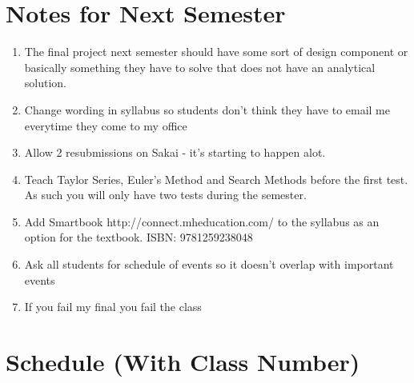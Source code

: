 \section{Notes for Next Semester}

\begin{enumerate}

\item The final project next semester should have some sort of design
  component or basically something they have to solve that does not
  have an analytical solution.

\item Change wording in syllabus so students don't think they have to
  email me everytime they come to my office

\item Allow 2 resubmissions on Sakai - it's starting to happen alot.

\item Teach Taylor Series, Euler's Method and Search Methods before
  the first test. As such you will only have two tests during the
  semester.

\item Add Smartbook http://connect.mheducation.com/ to the syllabus as
  an option for the textbook. ISBN: 9781259238048

\item Ask all students for schedule of events so it doesn't overlap
  with important events

\item If you fail my final you fail the class

\end{enumerate}

\section{Schedule (With Class Number)}

